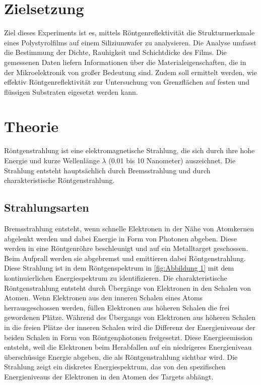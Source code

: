 \section{Zielsetzung}
\label{sec:Zielsetzung}
Ziel dieses Experiments ist es, mittels Röntgenreflektivität die Strukturmerkmale
eines Polystyrolfilms auf einem Siliziumwafer zu analysieren. Die Analyse umfasst die 
Bestimmung der Dichte, Rauhigkeit und Schichtdicke des Films. Die gemessenen Daten liefern
Informationen über die Materialeigenschaften, die in der Mikroelektronik von großer Bedeutung sind.
Zudem soll ermittelt werden, wie effektiv Röntgenreflektivität zur Untersuchung von Grenzflächen auf festen 
und flüssigen Substraten eigesetzt werden kann.


\section{Theorie}
\label{sec:Theorie}
Röntgenstrahlung ist eine elektromagnetische Strahlung, die sich durch ihre hohe Energie und kurze 
Wellenlänge \(\lambda\) (0.01 bis 10 Nanometer) auszeichnet. Die Strahlung entsteht hauptsächlich durch 
Bremsstrahlung und durch charakteristische Röntgenstrahlung.

\subsection{Strahlungsarten}
Bremsstrahlung entsteht, wenn schnelle Elektronen in der Nähe von Atomkernen abgelenkt werden und dabei Energie
in Form von Photonen abgeben. Diese werden in eine Röntgenröhre beschleunigt und auf ein Metalltarget geschossen.
Beim Aufprall werden sie abgebremst und emittieren dabei Röntgenstrahlung. Diese Strahlung ist in dem Röntgenspektrum in
\autoref{fig:Abbildung 1} mit dem kontinuierlichen Energiespektrum zu identifizieren.
Die charakteristische Röntgenstrahlung entsteht durch Übergänge von Elektronen in den Schalen von Atomen. Wenn Elektronen 
aus den inneren Schalen eines Atoms herrausgeschossen werden, füllen Elektronen aus höheren Schalen die frei gewordenen Plätze.
Während des Übergangs von Elektronen aus höheren Schalen in die freien Plätze der inneren Schalen wird die Differenz der
Energieniveaus der beiden Schalen in Form von Röntgenphotonen freigesetzt. Diese Energieemission entsteht, weil die Elektronen
beim Herabfallen auf ein niedrigeres Energieniveau überschüssige Energie abgeben, die als Röntgenstrahlung sichtbar wird. Die Strahlung 
zeigt ein diskretes Energiespektrum, das von den spezifischen Energieniveaus der Elektronen in den Atomen des Targets abhängt.


